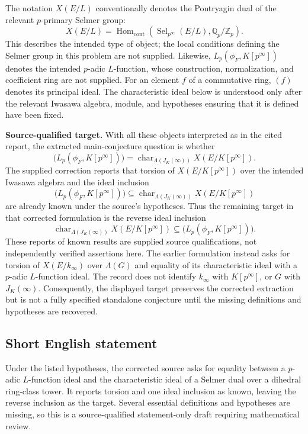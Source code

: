 \documentclass[11pt]{article}
\newcommand{\Z}{\mathbb{Z}}
\newcommand{\Q}{\mathbb{Q}}
\begin{document}
The notation \(X(E/L)\) conventionally denotes the Pontryagin dual of the relevant \(p\)-primary Selmer group:
\[
X(E/L)=\operatorname{Hom}_{\mathrm{cont}}\!\left(\operatorname{Sel}_{p^\infty}(E/L),\Q_p/\Z_p\right).
\]
This describes the intended type of object; the local conditions defining the Selmer group in this problem are not supplied. Likewise, \(L_p(\phi_F,K[p^\infty])\) denotes the intended \(p\)-adic \(L\)-function, whose construction, normalization, and coefficient ring are not supplied. For an element \(f\) of a commutative ring, \((f)\) denotes its principal ideal. The characteristic ideal below is understood only after the relevant Iwasawa algebra, module, and hypotheses ensuring that it is defined have been fixed.

\textbf{Source-qualified target.} With all these objects interpreted as in the cited report, the extracted main-conjecture question is whether
\[
\bigl(L_p(\phi_F,K[p^\infty])\bigr)
=
\operatorname{char}_{\Lambda(J_K(\infty))}
 X(E/K[p^\infty]).
\]
The supplied correction reports that torsion of \(X(E/K[p^\infty])\) over the intended Iwasawa algebra and the ideal inclusion
\[
\bigl(L_p(\phi_F,K[p^\infty])\bigr)
\subseteq
\operatorname{char}_{\Lambda(J_K(\infty))}
 X(E/K[p^\infty])
\]
are already known under the source's hypotheses. Thus the remaining target in that corrected formulation is the reverse ideal inclusion
\[
\operatorname{char}_{\Lambda(J_K(\infty))}
 X(E/K[p^\infty])
\subseteq
\bigl(L_p(\phi_F,K[p^\infty])\bigr).
\]
These reports of known results are supplied source qualifications, not independently verified assertions here. The earlier formulation instead asks for torsion of \(X(E/k_\infty)\) over \(\Lambda(G)\) and equality of its characteristic ideal with a \(p\)-adic \(L\)-function ideal. The record does not identify \(k_\infty\) with \(K[p^\infty]\), or \(G\) with \(J_K(\infty)\). Consequently, the displayed target preserves the corrected extraction but is not a fully specified standalone conjecture until the missing definitions and hypotheses are recovered.
\subsection{Short English statement}
Under the listed hypotheses, the corrected source asks for equality between a \(p\)-adic \(L\)-function ideal and the characteristic ideal of a Selmer dual over a dihedral ring-class tower. It reports torsion and one ideal inclusion as known, leaving the reverse inclusion as the target. Several essential definitions and hypotheses are missing, so this is a source-qualified statement-only draft requiring mathematical review.
\end{document}
